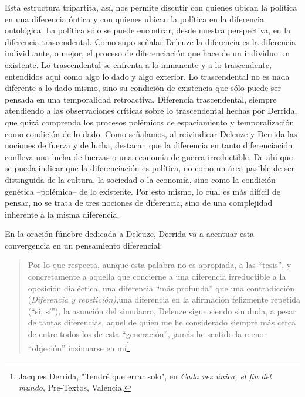 \documentclass{book}
\begin{document}
Esta estructura tripartita, así, nos permite discutir con quienes ubican
la política en una diferencia óntica y con quienes ubican la política en
la diferencia ontológica. La política sólo se puede encontrar, desde
nuestra perspectiva, en la diferencia trascendental. Como supo señalar
Deleuze la diferencia es la diferencia individuante, o mejor, el proceso
de diferenciación que hace de un individuo un existente. Lo
trascendental se enfrenta a lo inmanente y a lo trascendente, entendidos
aquí como algo lo dado y algo exterior. Lo trascendental no es nada
diferente a lo dado mismo, sino su condición de existencia que sólo
puede ser pensada en una temporalidad retroactiva. Diferencia
trascendental, siempre atendiendo a las observaciones críticas sobre lo
trascendental hechas por Derrida, que quizá comprenda los procesos
polémicos de espaciamiento y temporalización como condición de lo dado.
Como señalamos, al reivindicar Deleuze y Derrida las nociones de fuerza
y de lucha, destacan que la diferencia en tanto diferenciación conlleva
una lucha de fuerzas o una economía de guerra irreductible. De ahí que
se pueda indicar que la diferenciación es política, no como un área
pasible de ser distinguida de la cultura, la sociedad o la economía,
sino como la condición genética --polémica-- de lo existente. Por esto
mismo, lo cual es más difícil de pensar, no se trata de tres nociones de
diferencia, sino de una complejidad inherente a la misma diferencia.

En la oración fúnebre dedicada a Deleuze, Derrida va a acentuar esta
convergencia en un pensamiento diferencial:

\begin{quote}
Por lo que respecta, aunque esta palabra no es apropiada, a las
``tesis'', y concretamente a aquella que concierne a una diferencia
irreductible a la oposición dialéctica, una diferencia ``más profunda''
que una contradicción (\emph{Diferencia y repetición),}una diferencia en
la afirmación felizmente repetida (``sí, sí''), la asunción del
simulacro, Deleuze sigue siendo sin duda, a pesar de tantas diferencias,
aquel de quien me he considerado siempre más cerca de entre todos los de
esta ``generación'', jamás he sentido la menor ``objeción'' insinuarse
en mí\footnote{Jacques Derrida, "Tendré que errar solo", en \emph{Cada
  vez única, el fin del mundo}, Pre-Textos, Valencia.}.
\end{quote}
\end{document}
